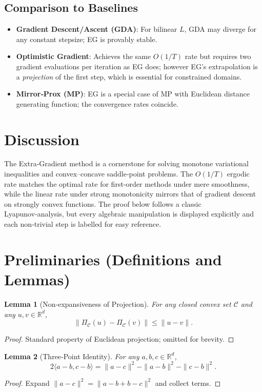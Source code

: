 \documentclass{article}
\newtheorem{lemma}{Lemma}
\begin{document}
\subsection{Comparison to Baselines}
\begin{itemize}[leftmargin=*]
\item \textbf{Gradient Descent/Ascent (GDA)}: For bilinear $L$, GDA may diverge for any constant stepsize; EG is provably stable.
\item \textbf{Optimistic Gradient}: Achieves the same $O(1/T)$ rate but requires two gradient evaluations per iteration as EG does; however EG’s extrapolation is a \emph{projection} of the first step, which is essential for constrained domains.
\item \textbf{Mirror‑Prox (MP)}: EG is a special case of MP with Euclidean distance generating function; the convergence rates coincide.
\end{itemize}

\section{Discussion}
The Extra‑Gradient method is a cornerstone for solving monotone variational inequalities and convex–concave saddle‑point problems. The $O(1/T)$ ergodic rate matches the optimal rate for first‑order methods under mere smoothness, while the linear rate under strong monotonicity mirrors that of gradient descent on strongly convex functions. The proof below follows a classic Lyapunov‑analysis, but every algebraic manipulation is displayed explicitly and each non‑trivial step is labelled for easy reference.

\section{Preliminaries (Definitions and Lemmas)}
\begin{lemma}[Non‑expansiveness of Projection]\label{lem:proj}
For any closed convex set $\mathcal{C}$ and any $u,v\in\mathbb{R}^{d}$,
\[
\|\Pi_{\mathcal{C}}(u)-\Pi_{\mathcal{C}}(v)\|\le \|u-v\|.
\]
\end{lemma}
\begin{proof}
Standard property of Euclidean projection; omitted for brevity. \qedhere
\end{proof}

\begin{lemma}[Three‑Point Identity]\label{lem:three}
For any $a,b,c\in\mathbb{R}^{d}$,
\[
2\langle a-b,c-b\rangle =\|a-c\|^{2}-\|a-b\|^{2}-\|c-b\|^{2}.
\]
\end{lemma}
\begin{proof}
Expand $\|a-c\|^{2}=\|a-b+b-c\|^{2}$ and collect terms. \qedhere
\end{proof}
\end{document}
